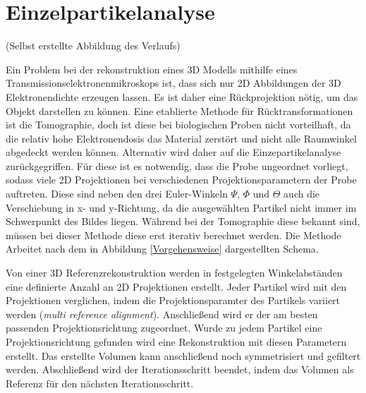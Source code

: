 \section{Einzelpartikelanalyse}

(Selbst erstellte Abbildung des Verlaufs)

Ein Problem bei der rekonstruktion eines 3D Modells mithilfe eines Transmissionselektronenmikroskops ist, dass sich nur 2D Abbildungen der 3D Elektronendichte erzeugen lassen.
Es ist daher eine Rückprojektion nötig, um das Objekt darstellen zu können.
Eine etablierte Methode für Rücktransformationen ist die Tomographie, doch ist diese bei biologischen Proben nicht vorteilhaft, da die relativ hohe Elektronendosis das Material zerstört und nicht alle Raumwinkel abgedeckt werden können.
Alternativ wird daher auf die Einzepartikelanalyse zurückgegriffen.
Für diese ist es notwendig, dass die Probe ungeordnet vorliegt, sodass viele 2D Projektionen bei verschiedenen Projektionsparametern der Probe auftreten.
Diese sind neben den drei Euler-Winkeln $\Psi$, $\Phi$ und $\Theta$ auch die Verschiebung in x- und y-Richtung, da die ausgewählten Partikel nicht immer im Schwerpunkt des Bildes liegen.
Während bei der Tomographie diese bekannt sind, müssen bei dieser Methode diese erst iterativ berechnet werden.
Die Methode Arbeitet nach dem in Abbildung \ref{Vorgehensweise} dargestellten Schema.

Von einer 3D Referenzrekonstruktion werden in festgelegten Winkelabständen eine definierte Anzahl an 2D Projektionen erstellt.
Jeder Partikel wird mit den Projektionen verglichen, indem die Projektionsparamter des Partikels variiert werden (\textit{multi reference alignment}). 
Anschließend wird er der am besten passenden Projektionsrichtung zugeordnet.
Wurde zu jedem Partikel eine Projektionsrichtung gefunden wird eine Rekonstruktion mit diesen Parametern erstellt.
Das erstellte Volumen kann anschließend noch symmetrisiert und gefiltert werden.
Abschließend wird der Iterationsschritt beendet, indem das Volumen als Referenz für den nächsten Iterationsschritt.

\FloatBarrier